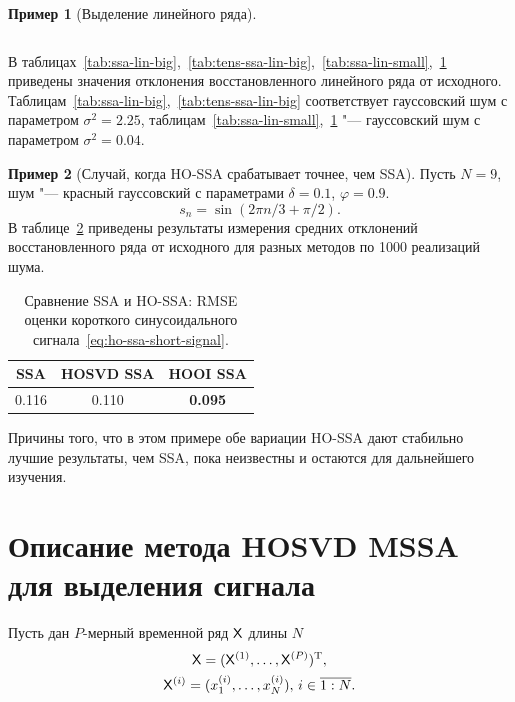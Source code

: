 \documentclass[specialist,
    substylefile = spbu_report.rtx,
    subf,href,colorlinks=true, 12pt]{disser}
\theoremstyle{plain}
\theoremstyle{definition}
\newtheorem{example}{Пример}[section]
\theoremstyle{remark}
\begin{document}
\begin{example}[Выделение линейного ряда]
\begin{table}[!ht]
\begin{tabular}{r|r|rrrrr}
                \hline
            \end{tabular}\label{tab:tens-ssa-lin-small}
        \end{table}
        В таблицах~\ref{tab:ssa-lin-big},~\ref{tab:tens-ssa-lin-big},~\ref{tab:ssa-lin-small},~\ref{tab:tens-ssa-lin-small}
        приведены значения отклонения восстановленного линейного ряда от исходного.
        Таблицам~\ref{tab:ssa-lin-big},~\ref{tab:tens-ssa-lin-big} соответствует гауссовский шум с параметром $\sigma^2=2.25$,
        таблицам~\ref{tab:ssa-lin-small},~\ref{tab:tens-ssa-lin-small} "--- гауссовский шум с параметром $\sigma^2=0.04$.
    \end{example}

    \begin{example}[Случай, когда HO-SSA срабатывает точнее, чем SSA]
        Пусть $N = 9$, шум "--- красный гауссовский с параметрами $\delta = 0.1$, $\varphi = 0.9$.
        \begin{equation}
            \label{eq:ho-ssa-short-signal}
            s_n = \sin(2\pi n/3 + \pi /2).
        \end{equation}
        В таблице~\ref{tab:tssa-better-ssa} приведены результаты измерения средних отклонений восстановленного ряда от исходного
        для разных методов по 1000 реализаций шума.

        \begin{table}[!ht]
            \centering
            \caption{Сравнение SSA и HO-SSA: RMSE оценки короткого синусоидального
            сигнала~\eqref{eq:ho-ssa-short-signal}.}
            \begin{tabular}{ccc}
                \hline
                SSA   & HOSVD SSA & HOOI SSA       \\
                \hline
                0.116 & 0.110     & \textbf{0.095} \\
                \hline
            \end{tabular}\label{tab:tssa-better-ssa}
        \end{table}

        Причины того, что в этом примере обе вариации HO-SSA дают стабильно лучшие результаты, чем SSA, пока неизвестны
        и остаются для дальнейшего изучения.
    \end{example}


    \section{Описание метода HOSVD MSSA для выделения сигнала}\label{sec:Tensor-MSSA-method-description}
    Пусть дан $P$-мерный временной ряд $\mathsf{X}$ длины $N$
    \begin{gather*}
        \mathsf{X} = (\mathsf{X}^{(1)}, \ldots, \mathsf{X}^{(P)})^{\mathrm{T}},\\
        \mathsf{X}^{(i)} = (x_1^{(i)}, \ldots, x_N^{(i)}),\, i \in \overline{1:N}.
    \end{gather*}
\end{document}
